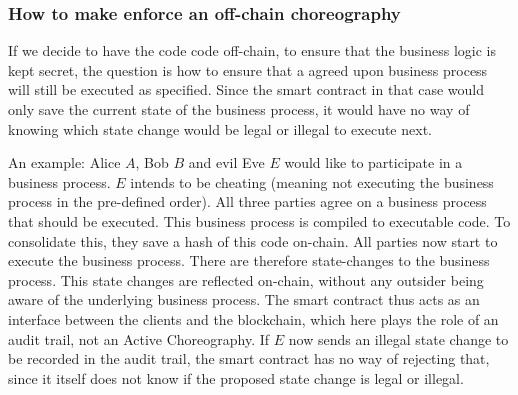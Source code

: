 \documentclass[runningheads]{llncs}
\newcommand{\comment}[1]{}
\begin{document}
\subsubsection{How to make enforce an off-chain choreography}

If we decide to have the code code off-chain, to ensure that the business logic is kept secret, the question is how to ensure that a agreed upon business process will still be executed as specified. Since the smart contract in that case would only save the current state of the business process, it would have no way of knowing which state change would be legal or illegal to execute next.

An example: Alice $A$, Bob $B$ and evil Eve $E$ would like to participate in a business process. $E$ intends to be cheating (meaning not executing the business process in the pre-defined order). All three parties agree on a business process that should be executed. This business process is compiled to executable code. To consolidate this, they save a hash of this code on-chain. All parties now start to execute the business process. There are therefore state-changes to the business process. This state changes are reflected on-chain, without any outsider being aware of the underlying business process. The smart contract thus acts as an interface between the clients and the blockchain, which here plays the role of an audit trail, not an Active Choreography. If $E$ now sends an illegal state change to be recorded in the audit trail, the smart contract has no way of rejecting that, since it itself does not know if the proposed state change is legal or illegal.

\comment{
A technique to avoid this is introduced by parity \footnote{https://wiki.parity.io/Private-Transactions}: In their implementation before a client can communicate with the blockchain, it has to validate its communication with a validator. \textit{How does the chain know that the validator has validated the client? Assumption: It will check the signature of the client and the validator and know that this validator is responsible for that client.}. To avoid all this overhead and to make communication more private, we propose to use a ring signature. Ring signatures were first introduced in 2001 by Rivest et al. and make it possible to specify a group of possible signers without giving away who the actual author of a signed message is \ref{rivest2001leak}. Ring signatures are already used in combination with blockchain technology, among others the CrypoNote protocol used in the Monero network \ref{van2013cryptonote}. In the protocol, a participant can not know from who or to who he or she is sending money or is receiving money from, only that the sender or receiver is part of a one-time ring signature.
}
\end{document}

